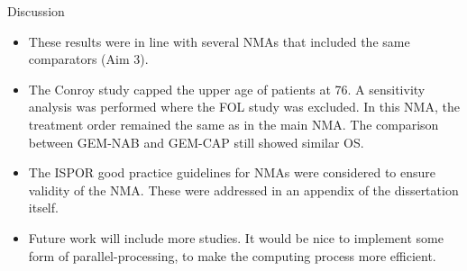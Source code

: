 \documentclass{beamer}
\begin{document}
\begin{frame}{Discussion}
    \begin{itemize}
        \item These results were in line with several NMAs that included the same comparators (Aim 3).
        \pause
        \item The Conroy study capped the upper age of patients at 76. A sensitivity analysis was performed where the FOL study was excluded. In this NMA, the treatment order remained the same as in the main NMA. The comparison between GEM-NAB and GEM-CAP still showed similar OS.
        \pause
        \item The ISPOR good practice guidelines for NMAs were considered to ensure validity of the NMA. These were addressed in an appendix of the dissertation itself.
        \pause
        \item Future work will include more studies. It would be nice to implement some form of parallel-processing, to make the computing process more efficient.
    \end{itemize}
\end{frame}
\end{document}
